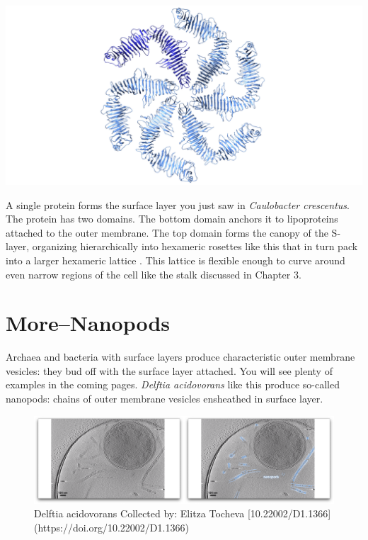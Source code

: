 \documentclass[]{tufte-book}
\begin{document}
\includegraphics{img/schematics/2_6_1}

A single protein forms the surface layer you just saw in
\emph{Caulobacter crescentus}. The protein has two domains. The bottom
domain anchors it to lipoproteins attached to the outer membrane. The
top domain forms the canopy of the S-layer, organizing hierarchically
into hexameric rosettes like this that in turn pack into a larger
hexameric lattice \citet{bharat2017}. This lattice is flexible enough to
curve around even narrow regions of the cell like the stalk discussed in
Chapter 3.

\hypertarget{morenanopods}{\section{More--Nanopods}\label{morenanopods}}

Archaea and bacteria with surface layers produce characteristic outer
membrane vesicles: they bud off with the surface layer attached. You
will see plenty of examples in the coming pages. \emph{Delftia
acidovorans} like this produce so-called nanopods: chains of outer
membrane vesicles ensheathed in surface layer.

\begin{figure}
\includegraphics{movie_stills/2_6a} \caption[Delftia acidovorans Collected by]{Delftia acidovorans Collected by: Elitza Tocheva [10.22002/D1.1366](https://doi.org/10.22002/D1.1366)}\label{fig:unnamed-chunk-36}
\end{figure}
\end{document}
